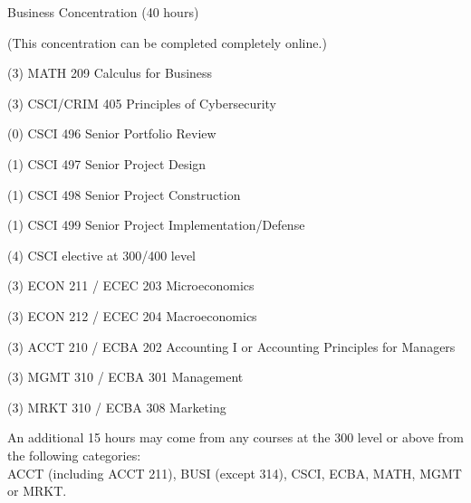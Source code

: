\begin{reqgroup}{Business Concentration (40 hours)}
\begin{center}%
(This concentration can be completed completely online.)\vspace{-0.5em}%
\end{center}%
\begin{checklist}
\begin{minipage}[t]{0.5\linewidth}
	\item (3) MATH 209	Calculus for Business
	\item (3) CSCI/CRIM 405	Principles of Cybersecurity
	\item (0) CSCI 496	Senior Portfolio Review
	\item (1) CSCI 497	Senior Project Design
	\item (1) CSCI 498	Senior Project Construction
	\item (1) CSCI 499	Senior Project Implementation/Defense
	\item (4) CSCI elective at 300/400 level
\end{minipage}
\begin{minipage}[t]{0.5\linewidth}
	\item (3) ECON 211 / ECEC 203 Microeconomics
	\item (3) ECON 212 / ECEC 204 Macroeconomics
	\item (3) ACCT 210 / ECBA 202	Accounting I or Accounting Principles for Managers
	\item (3) MGMT 310 / ECBA 301	Management
	\item (3) MRKT 310 / ECBA 308	Marketing
\end{minipage}
\end{checklist}

\tcblower

An additional 15 hours may come from any courses at the 300 level or above from the following categories: \\ACCT (including ACCT 211), BUSI (except 314), CSCI, ECBA, MATH, MGMT or MRKT.
\begin{checklist}
\begin{minipage}[t]{0.5\linewidth}
	\blankReq
	\blankReq
	\blankReq
\end{minipage}
\begin{minipage}[t]{0.5\linewidth}
	\blankReq
	\blankReq
\end{minipage}
\end{checklist}
\end{reqgroup}

